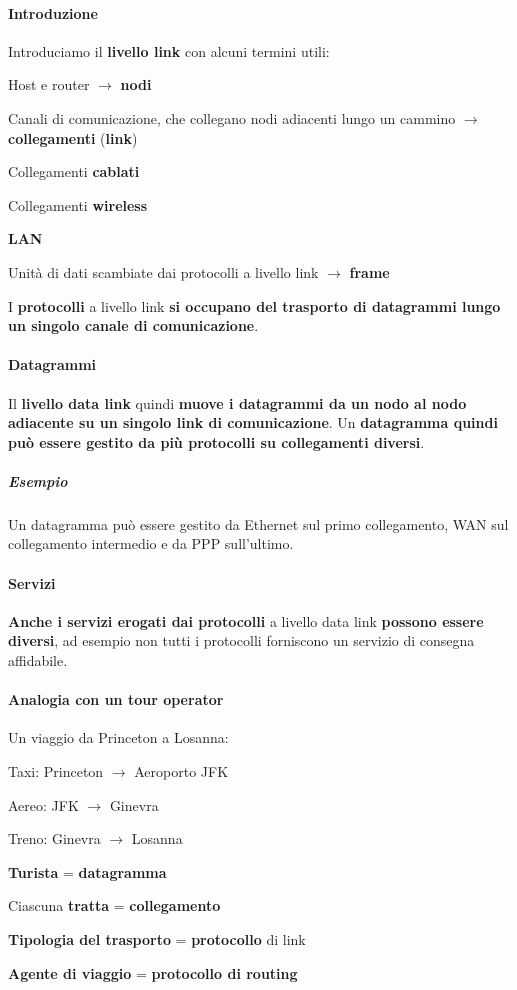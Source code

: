 \documentclass[10pt]{article}
\begin{document}
\paragraph{Introduzione} Introduciamo il \textbf{livello link} con alcuni termini utili:
\begin{list}{}{}
	\item Host e router $\rightarrow$ \textbf{nodi}
	\item Canali di comunicazione, che collegano nodi adiacenti lungo un cammino $\rightarrow$ \textbf{collegamenti} (\textbf{link})
	\begin{list}{}{}
		\item Collegamenti \textbf{cablati}
		\item Collegamenti \textbf{wireless}
		\item \textbf{LAN}
	\end{list}
	\item Unità di dati scambiate dai protocolli a livello link $\rightarrow$ \textbf{frame}
\end{list}
I \textbf{protocolli} a livello link \textbf{si occupano del trasporto di datagrammi lungo un singolo canale di comunicazione}.
\paragraph{Datagrammi} Il \textbf{livello data link} quindi \textbf{muove i datagrammi da un nodo al nodo adiacente su un singolo link di comunicazione}. Un \textbf{datagramma quindi può essere gestito da più protocolli su collegamenti diversi}.
\subparagraph{Esempio} Un datagramma può essere gestito da Ethernet sul primo collegamento, WAN sul collegamento intermedio e da PPP sull'ultimo.
\paragraph{Servizi} \textbf{Anche i servizi erogati dai protocolli} a livello data link \textbf{possono essere diversi}, ad esempio non tutti i protocolli forniscono un servizio di consegna affidabile.
\paragraph{Analogia con un tour operator} Un viaggio da Princeton a Losanna:
\begin{list}{}{}
	\item Taxi: Princeton $\longrightarrow$ Aeroporto JFK
	\item Aereo: JFK $\longrightarrow$ Ginevra
	\item Treno: Ginevra $\longrightarrow$ Losanna
	\item
	\item \textbf{Turista} = \textbf{datagramma}
	\item Ciascuna \textbf{tratta} = \textbf{collegamento}
	\item \textbf{Tipologia del trasporto} = \textbf{protocollo} di link
	\item \textbf{Agente di viaggio} = \textbf{protocollo di routing}
\end{list}
\end{document}
